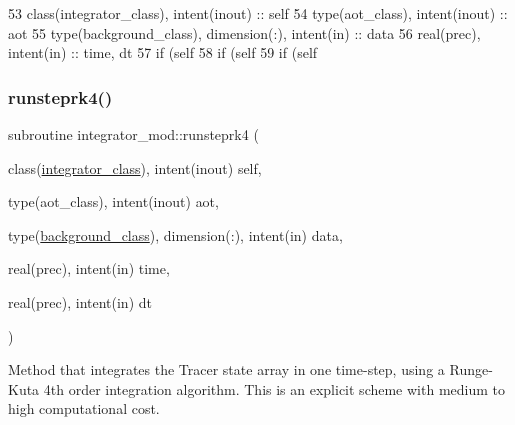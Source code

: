\begin{DoxyCode}
53     \textcolor{keywordtype}{class}(integrator\_class), \textcolor{keywordtype}{intent(inout)} :: self
54     \textcolor{keywordtype}{type}(aot\_class), \textcolor{keywordtype}{intent(inout)} :: aot
55     \textcolor{keywordtype}{type}(background\_class), \textcolor{keywordtype}{dimension(:)}, \textcolor{keywordtype}{intent(in)} :: data
56     \textcolor{keywordtype}{real(prec)}, \textcolor{keywordtype}{intent(in)} :: time, dt
57     \textcolor{keywordflow}{if} (self%
58     \textcolor{keywordflow}{if} (self%
59     \textcolor{keywordflow}{if} (self%
\end{DoxyCode}
\mbox{\label{namespaceintegrator__mod_a5041a009a45095be904f30377c509e7e}} 
\subsubsection{\texorpdfstring{runsteprk4()}{runsteprk4()}}
{\footnotesize\ttfamily subroutine integrator\+\_\+mod\+::runsteprk4 (\begin{DoxyParamCaption}\item[{class(\mbox{\hyperlink{structintegrator__mod_1_1integrator__class}{integrator\+\_\+class}}), intent(inout)}]{self,  }\item[{type(aot\+\_\+class), intent(inout)}]{aot,  }\item[{type(\mbox{\hyperlink{structbackground__mod_1_1background__class}{background\+\_\+class}}), dimension(\+:), intent(in)}]{data,  }\item[{real(prec), intent(in)}]{time,  }\item[{real(prec), intent(in)}]{dt }\end{DoxyParamCaption})\hspace{0.3cm}{\ttfamily [private]}}



Method that integrates the Tracer state array in one time-\/step, using a Runge-\/\+Kuta 4th order integration algorithm. This is an explicit scheme with medium to high computational cost. 

